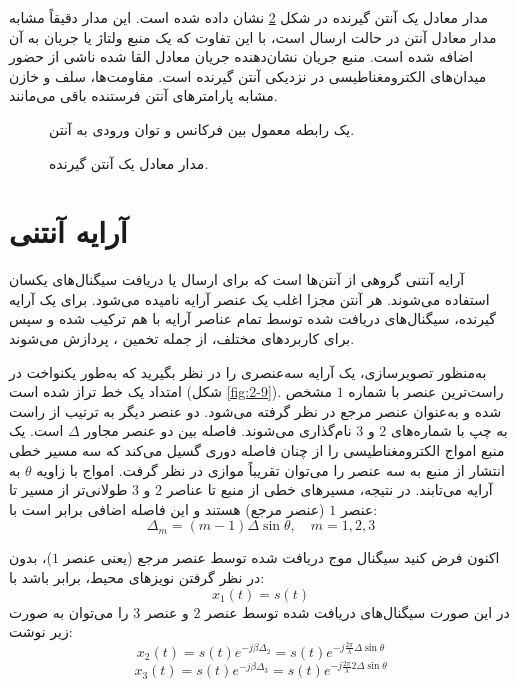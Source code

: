 مدار معادل یک آنتن گیرنده در شکل \ref{fig:2-8} نشان داده شده است. این مدار دقیقاً مشابه مدار معادل آنتن در حالت ارسال است، با این تفاوت که یک منبع ولتاژ یا جریان به آن اضافه شده است. منبع جریان نشان‌دهنده جریان معادل القا شده ناشی از حضور میدان‌های الکترومغناطیسی در نزدیکی آنتن گیرنده است. مقاومت‌ها، سلف و خازن مشابه پارامترهای آنتن فرستنده باقی می‌مانند.

\begin{figure}[ht]
	\centering
	\caption{یک رابطه معمول بین فرکانس و توان ورودی به آنتن.}
	\label{fig:2-7}
\end{figure}

\begin{figure}[ht]
	\centering
	\caption{مدار معادل یک آنتن گیرنده.}
	\label{fig:2-8}
\end{figure}






\section{آرایه آنتنی}
\label{sec:2-3}

آرایه آنتنی گروهی از آنتن‌ها است که برای ارسال یا دریافت سیگنال‌های یکسان استفاده می‌شوند. هر آنتن مجزا اغلب یک عنصر آرایه نامیده می‌شود. برای یک آرایه گیرنده، سیگنال‌های دریافت شده توسط تمام عناصر آرایه با هم ترکیب شده و سپس برای کاربردهای مختلف، از جمله تخمین ، پردازش می‌شوند.

به‌منظور تصویرسازی، یک آرایه سه‌عنصری را در نظر بگیرید که به‌طور یکنواخت در امتداد یک خط تراز شده است (شکل \ref{fig:2-9}). راست‌ترین عنصر با شماره $1$ مشخص شده و به‌عنوان عنصر مرجع در نظر گرفته می‌شود. دو عنصر دیگر به ترتیب از راست به چپ با شماره‌های $2$ و $3$ نام‌گذاری می‌شوند. فاصله بین دو عنصر مجاور $\Delta$ است. یک منبع امواج الکترومغناطیسی را از چنان فاصله دوری گسیل می‌کند که سه مسیر خطی انتشار از منبع به سه عنصر را می‌توان تقریباً موازی در نظر گرفت. امواج با زاویه $\theta$ به آرایه می‌تابند. در نتیجه، مسیرهای خطی از منبع تا عناصر $2$ و $3$ طولانی‌تر از مسیر تا عنصر $1$ (عنصر مرجع) هستند و این فاصله اضافی برابر است با:
\begin{equation}
	\Delta_m = (m-1) \Delta \sin \theta, \quad m=1, 2, 3
	\label{eq:2-1}
\end{equation}

اکنون فرض کنید سیگنال موج دریافت شده توسط عنصر مرجع (یعنی عنصر $1$)، بدون در نظر گرفتن نویزهای محیط، برابر باشد با:
\begin{equation}
	x_1(t) = s(t)
	\label{eq:2-2}
\end{equation}
در این صورت سیگنال‌های دریافت شده توسط عنصر $2$ و عنصر $3$ را می‌توان به صورت زیر نوشت:
\begin{equation}
	x_2(t) = s(t) e^{-j\beta\Delta_2} = s(t) e^{-j \frac{2\pi}{\lambda} \Delta \sin \theta}
	\label{eq:2-3}
\end{equation}
\begin{equation}
	x_3(t) = s(t) e^{-j\beta\Delta_3} = s(t) e^{-j \frac{2\pi}{\lambda} 2\Delta \sin \theta}
	\label{eq:2-4}
\end{equation}

